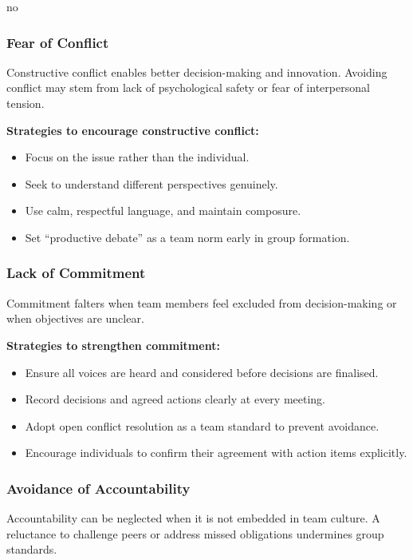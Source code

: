 no\documentclass{article}
\begin{document}
\subsubsection{Fear of Conflict}

Constructive conflict enables better decision-making and innovation. Avoiding conflict may stem from lack of psychological safety or fear of interpersonal tension.

\textbf{Strategies to encourage constructive conflict:}
\begin{itemize}
    \item Focus on the issue rather than the individual.
    \item Seek to understand different perspectives genuinely.
    \item Use calm, respectful language, and maintain composure.
    \item Set “productive debate” as a team norm early in group formation.
\end{itemize}

\subsubsection{Lack of Commitment}

Commitment falters when team members feel excluded from decision-making or when objectives are unclear.

\vspace{1em}
\textbf{Strategies to strengthen commitment:}
\begin{itemize}
    \item Ensure all voices are heard and considered before decisions are finalised.
    \item Record decisions and agreed actions clearly at every meeting.
    \item Adopt open conflict resolution as a team standard to prevent avoidance.
    \item Encourage individuals to confirm their agreement with action items explicitly.
\end{itemize}

\subsubsection{Avoidance of Accountability}

Accountability can be neglected when it is not embedded in team culture. A reluctance to challenge peers or address missed obligations undermines group standards.
\end{document}
